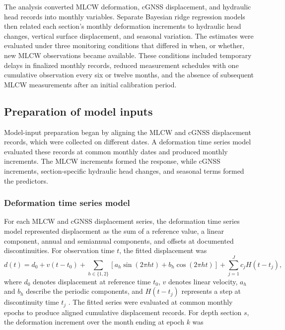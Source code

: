 The analysis converted MLCW deformation, cGNSS displacement, and hydraulic head records into monthly variables. Separate Bayesian ridge regression models then related each section's monthly deformation increments to hydraulic head changes, vertical surface displacement, and seasonal variation. The estimates were evaluated under three monitoring conditions that differed in when, or whether, new MLCW observations became available. These conditions included temporary delays in finalized monthly records, reduced measurement schedules with one cumulative observation every six or twelve months, and the absence of subsequent MLCW measurements after an initial calibration period.

\subsection{Preparation of model inputs}
\label{subsec:predictor_preparation}

Model-input preparation began by aligning the MLCW and cGNSS displacement records, which were collected on different dates. A deformation time series model evaluated these records at common monthly dates and produced monthly increments. The MLCW increments formed the response, while cGNSS increments, section-specific hydraulic head changes, and seasonal terms formed the predictors.

\subsubsection{Deformation time series model}
\label{subsec:deformation_model}

For each MLCW and cGNSS displacement series, the deformation time series model represented displacement as the sum of a reference value, a linear component, annual and semiannual components, and offsets at documented discontinuities. For observation time $t$, the fitted displacement was
\begin{equation}
d(t)=d_0+v(t-t_0)
+\sum_{h\in\{1,2\}}
\left[a_h\sin(2\pi h t)+b_h\cos(2\pi h t)\right]
+\sum_{j=1}^{J}c_j H(t-t_j),
\label{eq:deformation_model}
\end{equation}
where $d_0$ denotes displacement at reference time $t_0$, $v$ denotes linear velocity, $a_h$ and $b_h$ describe the periodic components, and $H(t-t_j)$ represents a step at discontinuity time $t_j$ \citep{nikolaidis_observation_2002, bevis_2014}. The fitted series were evaluated at common monthly epochs to produce aligned cumulative displacement records. For depth section $s$, the deformation increment over the month ending at epoch $k$ was

